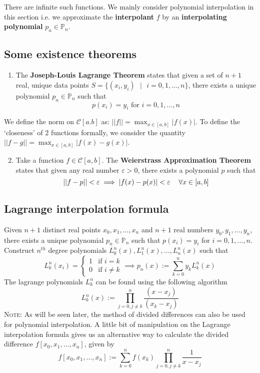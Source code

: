 \documentclass[11pt]{article}
\theoremstyle{definition}
\let\e\varepsilon
\newcommand{\C}{\mathcal{C}}
\begin{document}
There are infinite such functions. We mainly consider polynomial interpolation in this section i.e. we approximate the \textbf{interpolant} $f$ by an \textbf{interpolating polynomial} $p_n\in\mathbb{P}_n$.

\subsection{Some existence theorems}

\begin{enumerate}
	\item The \textbf{Joseph-Louis Lagrange Theorem} states that given a set of $n+1$ real, unique data points $S=\{(x_i,y_i)\text{ }|\text{ }i=0,1,\dots,n\}$, there exists a unique polynomial $p_n\in\mathbb{P}_n$ such that $$p(x_i)=y_i\text{ for }i=0,1,\dots,n$$
\end{enumerate}
We define the norm on $\mathcal{C}[a.b]$ as:
$\displaystyle||f||=\max_{x\in[a,b]}|f(x)|$. To define the `closeness' of 2 functions formally, we consider the quantity
$\displaystyle||f-g||=\max_{x\in [a,b]}\left|f(x)-g(x)\right|$. 
\begin{enumerate}
	\setcounter{enumi}{1}
	\item  Take a function $f\in\C[a,b]$. The \textbf{Weierstrass Approximation Theorem} states that given any real number $\e>0$, there exists a polynomial $p$ such that 
$$||f-p||<\e\implies |f(x)-p(x)|<\e\text{\hspace{12pt}}\forall x\in[a,b]$$
\end{enumerate}

\subsection{Lagrange interpolation formula} 
Given $n+1$ distinct real points $x_0,x_1,\dots,x_n$ and $n+1$ real numbers $y_0,y_1,\dots,y_n$, there exists a unique polynomial $p_n\in\mathbb{P}_n$ such that $p(x_i)=y_i$ for $ i=0,1,\dots,n$. Construct $n^{th}$ degree polynomials $L_0^n(x),L_1^n(x),\dots,L_n^n(x)$ such that
$$L_k^n(x_i)=\left\lbrace\begin{array}{lr}
1 & \text{if } i=k\\
0 & \text{if } i\neq k
\end{array}\right.\implies \boxed{p_n(x):=\sum_{k=0}^ny_kL_k^n(x)}$$
The lagrange polynomials $L_k^n$ can be found using the following algorithm
$$\boxed{L_k^n(x):=\prod_{j=0,j\neq k}^n\frac{(x-x_j)}{(x_k-x_j)}}$$
\textsc{Note:} As will be seen later, the method of divided differences can also be used for polynomial interpolation. A little bit of manipulation on the Lagrange interpolation formula gives us an alternative way to calculate the divided difference $f[x_0,x_1,\dots,x_n]$, given by $$f[x_0,x_1,\dots,x_n]:=\sum_{k=0}^nf(x_k)\prod_{j=0,j\neq k}^{n}\frac{1}{x-x_j}$$
\newpage
\end{document}
